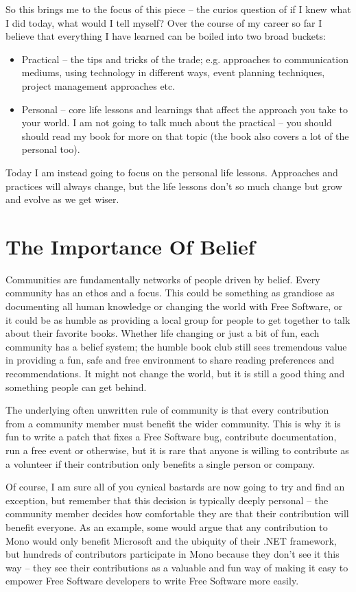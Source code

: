 So this brings me to the focus of this piece – the curios question of if I knew what I did today, what would I tell myself? Over the course of my career so far I believe that everything I have learned can be boiled into two broad buckets:
\begin{itemize}
 \item Practical – the tips and tricks of the trade; e.g. approaches to communication mediums, using technology in different ways, event planning techniques, project management approaches etc.
 \item Personal – core life lessons and learnings that affect the approach you take to your world.
I am not going to talk much about the practical – you should should read my book for more on that topic (the book also covers a lot of the personal too).
\end{itemize}
Today I am instead going to focus on the personal life lessons. Approaches and practices will always change, but the life lessons don’t so much change but grow and evolve as we get wiser.

\section*{The Importance Of Belief}

Communities are fundamentally networks of people driven by belief. Every community has an ethos and a focus. This could be something as grandiose as documenting all human knowledge or changing the world with Free Software, or it could be as humble as providing a local group for people to get together to talk about their favorite books. Whether life changing or just a bit of fun, each community has a belief system; the humble book club still sees tremendous value in providing a fun, safe and free environment to share reading preferences and recommendations. It might not change the world, but it is still a good thing and something people can get behind.

The underlying often unwritten rule of community is that every contribution from a community member must benefit the wider community. This is why it is fun to write a patch that fixes a Free Software bug, contribute documentation, run a free event or otherwise, but it is rare that anyone is willing to contribute as a volunteer if their contribution only benefits a single person or company.

Of course, I am sure all of you cynical bastards are now going to try and find an exception, but remember that this decision is typically deeply personal – the community member decides how comfortable they are that their contribution will benefit everyone. As an example, some would argue that any contribution to Mono would only benefit Microsoft and the ubiquity of their .NET framework, but hundreds of contributors participate in Mono because they don’t see it this way – they see their contributions as a valuable and fun way of making it easy to empower Free Software developers to write Free Software more easily.

